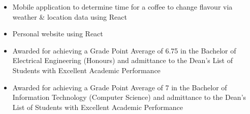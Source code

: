 
	

	\begin{itemize}
		\item Mobile application to determine time for a coffee to change flavour via weather \& location data using React		
		\item Personal website using React
	\end{itemize}


\medskip

	\begin{itemize}
		\item  Awarded for achieving a Grade Point Average of 6.75 in the Bachelor of Electrical Engineering
 (Honours) and admittance to the Dean's List of Students with Excellent Academic
 Performance
	\end{itemize}
	\begin{itemize}
		\item  Awarded for achieving a Grade Point Average of 7 in the Bachelor of Information Technology
 (Computer Science) and admittance to the Dean's List of Students with Excellent Academic
 Performance
	\end{itemize}